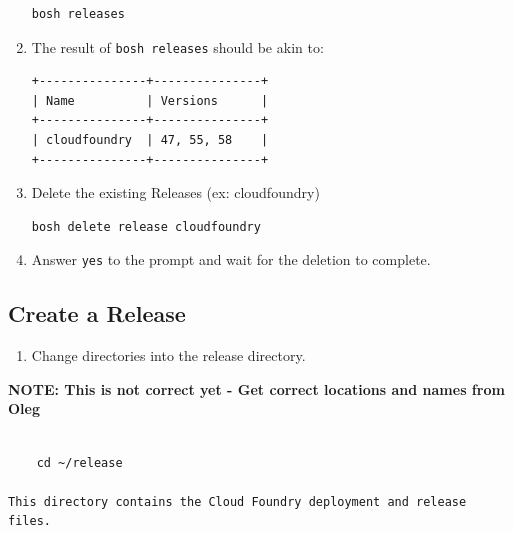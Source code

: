 \begin{enumerate}
\begin{verbatim}
bosh releases
\end{verbatim}


\item The result of \texttt{bosh releases} should be akin to:

\begin{verbatim}
+---------------+---------------+
| Name          | Versions      |
+---------------+---------------+
| cloudfoundry  | 47, 55, 58    |
+---------------+---------------+
\end{verbatim}


\item Delete the existing Releases (ex: cloudfoundry) 

\begin{verbatim}
bosh delete release cloudfoundry
\end{verbatim}


\item Answer \texttt{yes} to the prompt and wait for the deletion to complete.

\end{enumerate}

\subsection{Create a Release}
\label{createarelease}

\begin{enumerate}
\item Change directories into the release directory.

\end{enumerate}

\textbf{NOTE: This is not correct yet - Get correct locations and names from Oleg}

\begin{adjustwidth}{2.5em}{2.5em}
\begin{verbatim}

    cd ~/release

This directory contains the Cloud Foundry deployment and release files.

\end{verbatim}
\end{adjustwidth}

